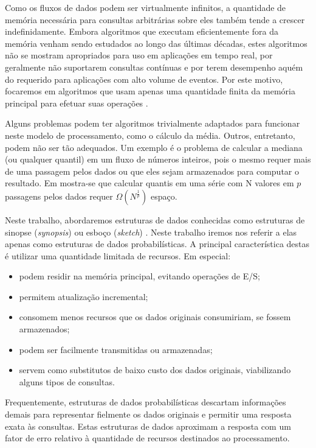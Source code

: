 Como os fluxos de dados podem ser virtualmente infinitos, a quantidade de memória necessária para consultas arbitrárias sobre eles também tende a crescer indefinidamente. Embora algoritmos que executam eficientemente fora da memória venham sendo estudados ao longo das últimas décadas, estes algoritmos não se mostram apropriados para uso em aplicações em tempo real, por geralmente não suportarem consultas contínuas e por terem desempenho aquém do requerido para aplicações com alto volume de eventos. Por este motivo, focaremos em algoritmos que usam apenas uma quantidade finita da memória principal para efetuar suas operações \cite{alon1996space}.

Alguns problemas podem ter algoritmos trivialmente adaptados para funcionar neste modelo de processamento, como o cálculo da média. Outros, entretanto, podem não ser tão adequados. Um exemplo é o problema de calcular a mediana (ou qualquer quantil) em um fluxo de números inteiros, pois o mesmo requer mais de uma passagem pelos dados ou que eles sejam armazenados para computar o resultado. Em \cite{munro1980selection} mostra-se que calcular quantis em uma série com N valores em $p$ passagens pelos dados requer $\Omega(N^{\frac{1}{p}})$ espaço.

Neste trabalho, abordaremos estruturas de dados conhecidas como estruturas de sinopse (\emph{synopsis}) ou esboço (\emph{sketch}) \cite{gibbons1999synopsis}. Neste trabalho iremos nos referir a elas apenas como estruturas de dados probabilísticas. A principal característica destas é utilizar uma quantidade limitada de recursos. Em especial:

\begin{itemize}
  \item podem residir na memória principal, evitando operações de E/S;
  \item permitem atualização incremental;
  \item consomem menos recursos que os dados originais consumiriam, se fossem armazenados;
  \item podem ser facilmente transmitidas ou armazenadas;
  \item servem como substitutos de baixo custo dos dados originais, viabilizando alguns tipos de consultas.
\end{itemize}

Frequentemente, estruturas de dados probabilísticas descartam informações demais para representar fielmente os dados originais e permitir uma resposta exata às consultas. Estas estruturas de dados aproximam a resposta com um fator de erro relativo à quantidade de recursos destinados ao processamento.

